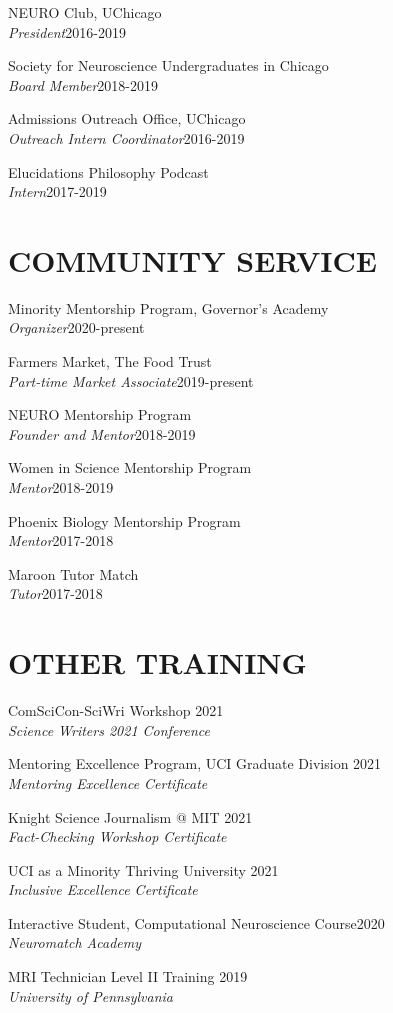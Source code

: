 \documentclass[margin, 10pt]{res} %
\begin{document}
\begin{resume}
{NEURO Club, UChicago} \\
{\sl President}\hfill{2016-2019}

{Society for Neuroscience Undergraduates in Chicago} \\
{\sl Board Member}\hfill{2018-2019}

{Admissions Outreach Office, UChicago} \\
{\sl Outreach Intern Coordinator}\hfill{2016-2019}

{Elucidations Philosophy Podcast} \\
{\sl Intern}\hfill{2017-2019}


\section{COMMUNITY SERVICE}


{Minority Mentorship Program, Governor's Academy} \\
{\sl Organizer}\hfill 2020-present

{Farmers Market, The Food Trust} \\
{\sl Part-time Market Associate}\hfill 2019-present

{NEURO Mentorship Program} \\
{\sl Founder and Mentor}\hfill{2018-2019}

{Women in Science Mentorship Program} \\
{\sl Mentor}\hfill{2018-2019}

{Phoenix Biology Mentorship Program} \\
{\sl Mentor}\hfill{2017-2018}

{Maroon Tutor Match} \\
{\sl Tutor}\hfill{2017-2018}




\section{OTHER TRAINING} 
ComSciCon-SciWri Workshop \hfill 2021 \\
{\sl  Science Writers 2021 Conference}

Mentoring Excellence Program, UCI Graduate Division \hfill 2021 \\
{\sl  Mentoring Excellence Certificate}

Knight Science Journalism @ MIT \hfill 2021 \\
{\sl  Fact-Checking Workshop Certificate}

UCI as a Minority Thriving University \hfill 2021 \\
{\sl Inclusive Excellence Certificate}

Interactive Student, Computational Neuroscience Course\hfill 2020 \\
{\sl Neuromatch Academy}

MRI Technician Level II Training \hfill 2019 \\
{\sl University of Pennsylvania}


\end{resume}
\end{document}
